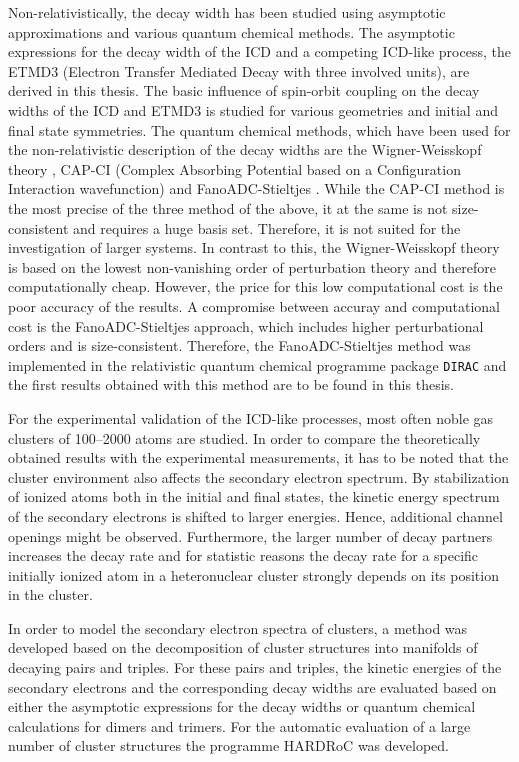 Non-relativistically, the decay width has been studied using asymptotic
approximations \cite{Gokhberg10_1} and various quantum chemical methods.
The asymptotic expressions for the decay width of the \ac{ICD} and a competing
\ac{ICD}-like process, the ETMD3 (Electron Transfer Mediated Decay with three
involved units), are derived in this thesis. The basic influence of
spin-orbit coupling on the decay widths of the \ac{ICD} and ETMD3 is studied
for various geometries and initial and final state symmetries.
The quantum chemical methods, which have been used for the non-relativistic 
description of the decay widths are the Wigner-Weisskopf theory \cite{Santra02},
CAP-CI
(Complex Absorbing Potential based on a Configuration Interaction wavefunction)
\cite{SakuraiModern94,Santra01_3} and FanoADC-Stieltjes \cite{Averbukh05}.
While the CAP-CI method is the most precise of the three method of the above,
it at the same
is not size-consistent and requires a huge basis set. Therefore, it is not
suited for the investigation of larger systems. In contrast to this, the
Wigner-Weisskopf theory is based on the lowest non-vanishing order of perturbation
theory and therefore computationally cheap. However, the price for this low
computational cost is the poor accuracy of the results. A compromise between
accuray and computational cost is the FanoADC-Stieltjes approach, which includes
higher perturbational orders and is size-consistent.
Therefore, the FanoADC-Stieltjes method was implemented in the relativistic
quantum chemical programme package \verb|DIRAC| \cite{DIRAC13} and the first results
obtained with this method are to be found in this thesis.

For the experimental validation of the \ac{ICD}-like processes, most often
noble gas clusters of 100--2000 atoms are studied. In order to compare the
theoretically obtained results with the experimental measurements, it has
to be noted that the cluster environment also affects the secondary electron
spectrum. By stabilization of ionized atoms both in the initial and final
states, the kinetic energy spectrum of the secondary electrons is shifted to
larger energies. Hence, additional channel openings might be observed.
Furthermore, the larger number of decay partners increases the decay rate
and for statistic reasons the decay rate for a specific initially ionized
atom in a heteronuclear cluster strongly depends on its position in the cluster.

In order to model the secondary electron spectra of clusters, a method
was developed based on the decomposition of cluster structures into manifolds
of decaying pairs and triples. For these pairs and triples, the kinetic energies
of the secondary electrons and the corresponding decay widths are evaluated based
on either the asymptotic expressions for the decay widths or quantum chemical
calculations for dimers and trimers. For the automatic evaluation of
a large number of cluster structures the programme
\ac{HARDRoC} \cite{HARDRoC} was developed.

